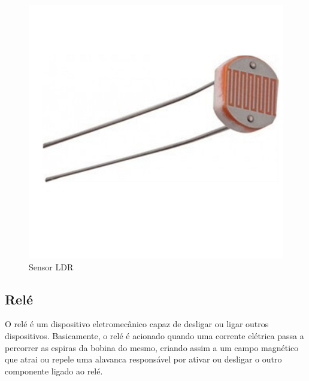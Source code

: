 \begin{figure}[H]
      \centering
      \includegraphics[scale=0.10]{figuras/Fldr.jpg}
      \caption{Sensor LDR}
      \label{fig:SLDR}
\end{figure}




\subsection{Relé}

O relé é um dispositivo eletromecânico capaz de desligar ou ligar outros dispositivos. Basicamente, o relé é acionado quando uma corrente elétrica passa a percorrer as espiras da bobina do mesmo, criando assim a um campo magnético que atrai ou repele uma alavanca responsável por ativar ou desligar o outro componente ligado ao relé. 

